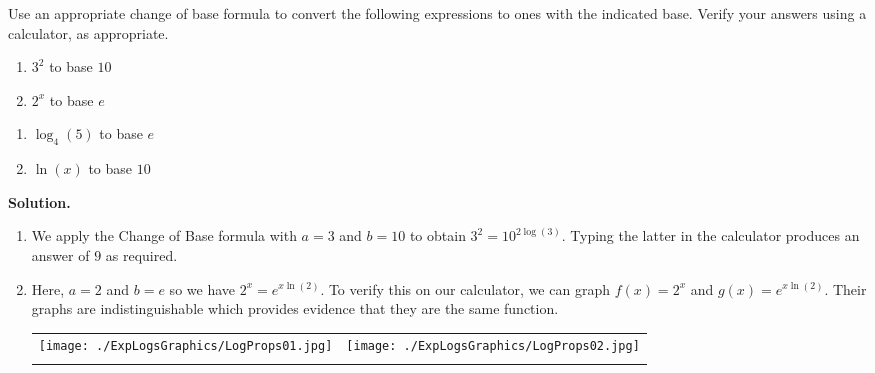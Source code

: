 \begin{ex}  Use an appropriate change of base formula to convert the following expressions to ones with the indicated base.  Verify your answers using a calculator, as appropriate.
\begin{multicols}{2}
\begin{enumerate}

\item  $3^{2}$ to base $10$

\item  $2^{x}$ to base $e$

\setcounter{HW}{\value{enumi}}
\end{enumerate}
\end{multicols}

\begin{multicols}{2}
\begin{enumerate}
\setcounter{enumi}{\value{HW}}


\item $\log_{4}(5)$ to base $e$

\item $\ln(x)$ to base $10$

\end{enumerate}
\end{multicols}

{\bf Solution.}

\begin{enumerate}

\item  We apply the Change of Base formula with $a=3$ and $b=10$ to obtain $3^2 = 10^{2 \log(3)}$. Typing the latter in the calculator produces an answer of $9$ as required.

\item  Here, $a=2$ and $b = e$ so we have $2^{x} = e^{x \ln(2)}$.  To verify this on our calculator, we can graph $f(x) = 2^x$ and $g(x) = e^{x \ln(2)}$.  Their graphs are indistinguishable which provides evidence that they are the same function.

\begin{center}

\begin{tabular}{cc}

\texttt{[image: ./ExpLogsGraphics/LogProps01.jpg]} &

\hspace{1in} \texttt{[image: ./ExpLogsGraphics/LogProps02.jpg]} \\

 & 


\end{tabular}
\end{center}
\end{enumerate}
\end{ex}

